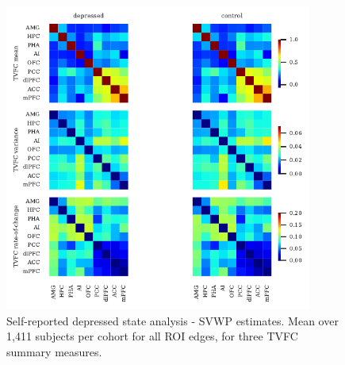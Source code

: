 \begin{figure}[ht]
  \centering
  \includegraphics[width=0.9\textwidth]{fig/ukbiobank/TVFC_predictions_summaries/self_reported_depression_state/cohort_comparison/ROI/correlation_TVFC_estimates_SVWP_joint_joint}
  \caption{
    Self-reported depressed state analysis - SVWP estimates.
    Mean over 1,411 subjects per cohort for all ROI edges, for three TVFC summary measures.
  }\label{fig:ukb-results-srds-roi-cohort-comparison-full-wp}
\end{figure}


